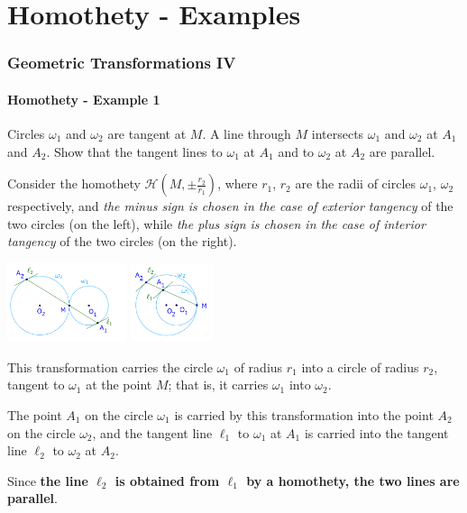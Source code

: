\documentclass[8pt,xcolor=table,dvipsnames]{beamer}
\begin{document}
\section{Homothety - Examples}

\begin{frame}[t]
    \frametitle{Geometric Transformations IV}
    \framesubtitle{Homothety - Example 1}
    \begin{example}
        Circles $\omega_1$ and $\omega_2$ are tangent at $M$.
        A line through $M$ intersects $\omega_1$ and $\omega_2$ at $A_1$ and $A_2.$
        Show that the tangent lines to $\omega_1$ at $A_1$ and to $\omega_2$ at $A_2$ are parallel.
    \end{example}
    Consider the homothety $\mathcal{H}(M,\pm\frac{r_2}{r_1})$, where $r_1$, $r_2$ are the radii of circles $\omega_1$, $\omega_2$ respectively,
    and \textit{the minus sign is chosen in the case of exterior tangency} of the two circles (on the left),
    while \textit{the plus sign is chosen in the case of interior tangency} of the two circles (on the right).
    \begin{center}
        \includegraphics[width=3.5cm]{./svg/pdf/homothety-p1.pdf}
        \qquad
        \includegraphics[width=2.4cm]{./svg/pdf/homothety-p1b.pdf}
    \end{center}
    This transformation carries the circle $\omega_1$ of radius $r_1$ into a circle of radius $r_2$, tangent to $\omega_1$ at the point $M$;
    that is, it carries $\omega_1$ into $\omega_2$.

    The point $A_1$ on the circle $\omega_1$ is carried by this transformation into the point $A_2$ on the circle $\omega_2$,
    and the tangent line $\ell_1$ to $\omega_1$ at $A_1$ is carried into the tangent line $\ell_2$ to $\omega_2$ at $A_2.$
    
    Since \textbf{the line $\ell_2$ is obtained from $\ell_1$ by a homothety, the two lines are parallel}.
\end{frame}
\end{document}
